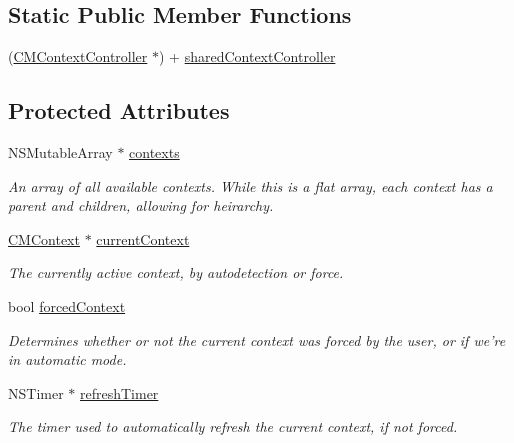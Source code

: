 \subsection*{Static Public Member Functions}
\begin{CompactItemize}
\item 
(\hyperlink{interface_c_m_context_controller}{CMContextController} $\ast$) + \hyperlink{interface_c_m_context_controller_a2960652b2098e1029d6f64841fcf030}{sharedContextController}
\end{CompactItemize}
\subsection*{Protected Attributes}
\begin{CompactItemize}
\item 
NSMutableArray $\ast$ \hyperlink{interface_c_m_context_controller_2563c65be09f418bb5ae7a6ce6389afe}{contexts}
\begin{CompactList}\small\item\em An array of all available contexts. While this is a flat array, each context has a parent and children, allowing for heirarchy. \item\end{CompactList}\item 
\hyperlink{interface_c_m_context}{CMContext} $\ast$ \hyperlink{interface_c_m_context_controller_8b34e13150d8651ccab4608b479808a0}{currentContext}
\begin{CompactList}\small\item\em The currently active context, by autodetection or force. \item\end{CompactList}\item 
bool \hyperlink{interface_c_m_context_controller_e518de0ebea35e4508147b44593b97e0}{forcedContext}
\begin{CompactList}\small\item\em Determines whether or not the current context was forced by the user, or if we're in automatic mode. \item\end{CompactList}\item 
NSTimer $\ast$ \hyperlink{interface_c_m_context_controller_ae5f83ba2bf74f94700ed577b2212f8a}{refreshTimer}
\begin{CompactList}\small\item\em The timer used to automatically refresh the current context, if not forced. \item\end{CompactList}\end{CompactItemize}


